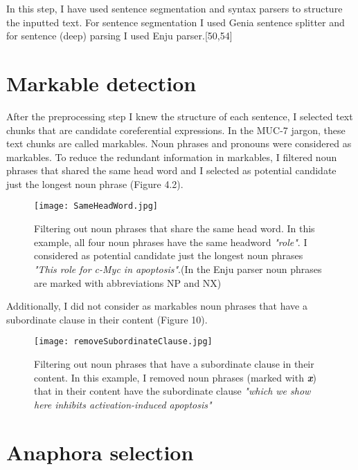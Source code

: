 In this step, I have used sentence segmentation and syntax parsers to structure the inputted text. For sentence segmentation I used Genia sentence splitter and for sentence (deep) parsing I used Enju parser.[50,54]

\section{Markable detection}

After the preprocessing step I knew the structure of each sentence, I selected text chunks that are candidate coreferential expressions. In the MUC-7 jargon, these text chunks are called markables. Noun phrases and pronouns were considered as markables. To reduce the redundant information in markables, I filtered noun phrases that shared the same head word and I selected as potential candidate just the longest noun phrase (Figure 4.2). 

\begin{figure}[h]
	\begin{center}
		\texttt{[image: SameHeadWord.jpg]} 
 		\caption[Filtering out noun phrases that share the same head word]{ Filtering out noun phrases that share the same head word. In this example, all four noun phrases have the same headword \emph{"role"}. I considered as potential candidate just the longest noun phrases \emph{"This role for c-Myc in apoptosis"}.(In the Enju parser noun phrases are marked with abbreviations NP and NX) }
		\label{Figure 9}
	\end{center}
\end{figure}

Additionally, I did not consider as markables noun phrases that have a subordinate clause in their content (Figure 10).

\begin{figure}[h]
	\begin{center}
		\texttt{[image: removeSubordinateClause.jpg]} 
 		\caption[Filtering out noun phrases that have a subordinate clause in their content]{ Filtering out noun phrases that have a subordinate clause in their content. In this example, I removed noun phrases (marked with \emph{\textbf{x}}) that in their content have the subordinate clause  \emph{"which we show here inhibits activation-induced apoptosis"} }
		\label{Figure 10}
	\end{center}
\end{figure}

\section{Anaphora selection}

